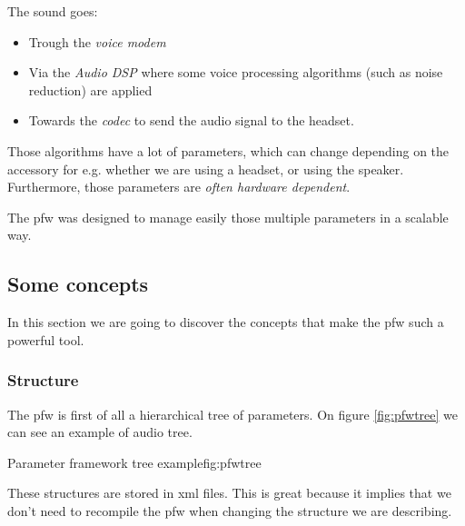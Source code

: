 The sound goes:
\begin{itemize}
    \item Trough the \emph{voice modem}
    \item Via the \emph{Audio DSP} where some voice processing algorithms (such as noise reduction) are applied
    \item Towards the \emph{codec} to send the audio signal to the headset.
\end{itemize}

Those algorithms have a lot of parameters, which can change depending on the accessory for e.g. whether we are using a headset,
or using the speaker. Furthermore, those parameters are \emph{often hardware dependent}.

The \gls{pfw} was designed to manage easily those multiple parameters in a scalable way.

\subsection{Some concepts}
In this section we are going to discover the concepts that make the
\gls{pfw} such a powerful tool.

\subsubsection{Structure}
The \gls{pfw} is first of all a hierarchical tree of parameters.
On figure \ref{fig:pfwtree} we can see an example of audio tree.

\begin{figureGraphics}{Parameter framework tree example}{fig:pfwtree}
\end{figureGraphics}

These structures are stored in \gls{xml} files. This is great because it implies that we don't need
to recompile the \gls{pfw} when changing the structure we are describing.

